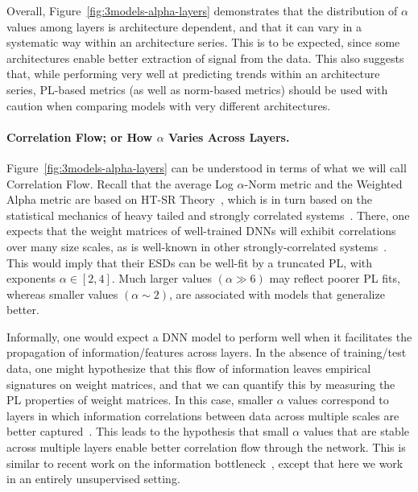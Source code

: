 Overall, Figure~\ref{fig:3models-alpha-layers} demonstrates that the distribution of $\alpha$ values among layers is architecture dependent, 
and that it can vary in a systematic way within an architecture series.
This is to be expected, since some architectures enable better extraction of signal from the data.
This also suggests that, while performing very well at predicting trends within an architecture series, PL-based metrics (as well as norm-based metrics) should be used with caution when comparing models with very different architectures.


\paragraph{Correlation Flow; or How $\alpha$ Varies Across Layers.}

Figure~\ref{fig:3models-alpha-layers} can be understood in terms of what we will call Correlation Flow.
Recall that the average Log $\alpha$-Norm metric and the Weighted Alpha metric are based on HT-SR Theory~\cite{MM18_TR, MM19_HTSR_ICML, MM20_SDM}, which is in turn based on the statistical mechanics of heavy tailed and strongly correlated systems~\cite{BouchaudPotters03, SornetteBook, BP11, bun2017}. 
There, one expects that the weight matrices of well-trained DNNs will exhibit correlations over many size scales, as is well-known in other strongly-correlated systems~\cite{BouchaudPotters03, SornetteBook}. 
This would imply that their ESDs can be well-fit by a truncated PL, with exponents $\alpha\in[2,4]$.
Much larger values $(\alpha\gg 6)$ may reflect poorer PL fits, whereas smaller values $(\alpha\sim 2)$, are associated with models that generalize better.

Informally, one would expect a DNN model to perform well when it facilitates the propagation of information/features across layers.
In the absence of training/test data, one might hypothesize that this flow of information leaves empirical signatures on weight matrices, and that we can quantify this by measuring the PL properties of weight matrices.
In this case, smaller $\alpha$ values correspond to layers in which information correlations between data across multiple scales are better captured~\cite{MM18_TR,SornetteBook}.
This leads to the hypothesis that small $\alpha$ values that are stable across multiple layers enable better correlation flow through the network.
This is similar to recent work on the information bottleneck~\cite{TZ15,ST17_TR}, except that here we work in an entirely unsupervised setting.

